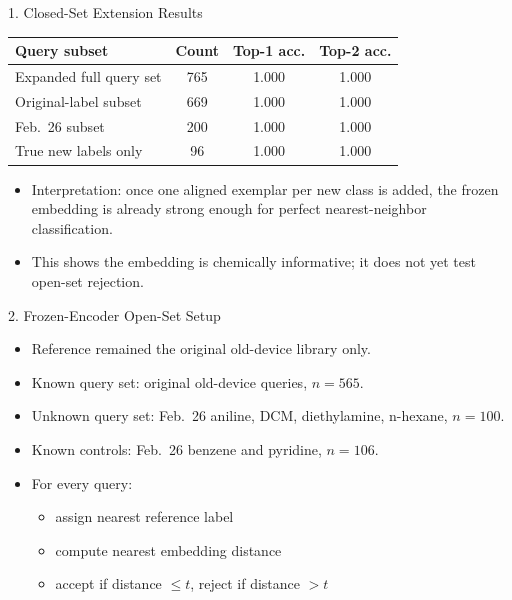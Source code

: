 \documentclass[aspectratio=169]{beamer}
\begin{document}
\begin{frame}{1. Closed-Set Extension Results}
  \centering
  \small
  \begin{tabular}{lccc}
    \toprule
    Query subset & Count & Top-1 acc. & Top-2 acc. \\
    \midrule
    Expanded full query set & 765 & 1.000 & 1.000 \\
    Original-label subset & 669 & 1.000 & 1.000 \\
    Feb.\ 26 subset & 200 & 1.000 & 1.000 \\
    True new labels only & 96 & 1.000 & 1.000 \\
    \bottomrule
  \end{tabular}

  \vspace{0.8em}
  \begin{itemize}
    \item Interpretation: once one aligned exemplar per new class is added, the frozen embedding is already strong enough for perfect nearest-neighbor classification.
    \item This shows the embedding is chemically informative; it does not yet test open-set rejection.
  \end{itemize}
\end{frame}

\begin{frame}{2. Frozen-Encoder Open-Set Setup}
  \begin{itemize}
    \item Reference remained the original old-device library only.
    \item Known query set: original old-device queries, \(n=565\).
    \item Unknown query set: Feb.\ 26 aniline, DCM, diethylamine, n-hexane, \(n=100\).
    \item Known controls: Feb.\ 26 benzene and pyridine, \(n=106\).
    \item For every query:
    \begin{itemize}
      \item assign nearest reference label
      \item compute nearest embedding distance
      \item accept if distance \(\le t\), reject if distance \(> t\)
    \end{itemize}
  \end{itemize}
\end{frame}
\end{document}
